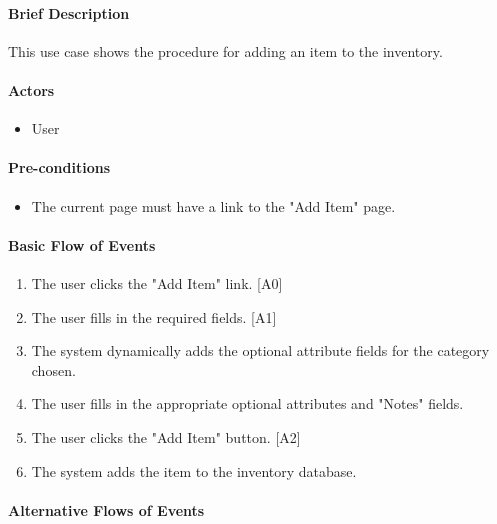 \documentclass{article}
\begin{document}
\paragraph{Brief Description}
This use case shows the procedure for adding an item to the inventory.

\paragraph{Actors}
\begin{itemize}
\item User
\end{itemize}

\paragraph{Pre-conditions}
\begin{itemize}
\item The current page must have a link to the "Add Item" page.
\end{itemize}

\paragraph{Basic Flow of Events}
\begin{enumerate}
\item The user clicks the "Add Item" link. [A0]
\item The user fills in the required fields. [A1]
\item The system dynamically adds the optional attribute fields for the category chosen.
\item The user fills in the appropriate optional attributes and "Notes" fields.
\item The user clicks the "Add Item" button. [A2]
\item The system adds the item to the inventory database.
\end{enumerate}

\paragraph{Alternative Flows of Events}
\end{document}
